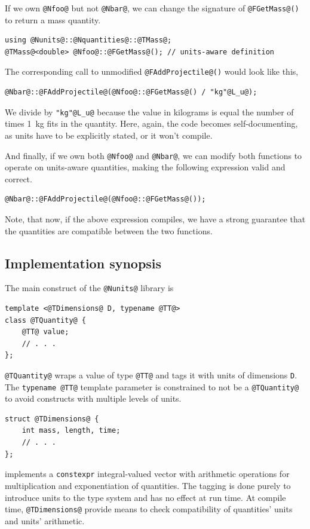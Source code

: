 \documentclass[11pt,letterpaper]{article}
\makeatletter
\newcommand{\lib}{\lstinline{@Nunits@} library}
\makeatother
\begin{document}
If we own \lstinline{@Nfoo@} but not \lstinline{@Nbar@}, we can change the signature of
\lstinline{@FGetMass@()} to return a mass quantity.
%
\begin{lstlisting}
using @Nunits@::@Nquantities@::@TMass@;
@TMass@<double> @Nfoo@::@FGetMass@(); // units-aware definition
\end{lstlisting}
%
The corresponding call to unmodified \lstinline{@FAddProjectile@()} would look like this,
%
\begin{lstlisting}[label={lst:example_division}]
@Nbar@::@FAddProjectile@(@Nfoo@::@FGetMass@() / "kg"@L_u@);
\end{lstlisting}
%
We divide by \lstinline{"kg"@L_u@} because the value in kilograms
is equal the number of times 1~kg fits in the quantity.
Here, again, the code becomes self-documenting, as units have to be explicitly stated, or it won't
compile.

And finally, if we own both \lstinline{@Nfoo@} and \lstinline{@Nbar@}, we can modify both functions
to operate on units-aware quantities, making the following expression valid and correct.
%
\begin{lstlisting}
@Nbar@::@FAddProjectile@(@Nfoo@::@FGetMass@());
\end{lstlisting}
Note, that now, if the above expression compiles, we have a strong guarantee that the quantities
are compatible between the two functions.

\subsection{Implementation synopsis} %

The main construct of the \lib{} is
%
\begin{lstlisting}
template <@TDimensions@ D, typename @TT@>
class @TQuantity@ {
    @TT@ value;
    // . . .
};
\end{lstlisting}
%
\lstinline{@TQuantity@} wraps a value of type \lstinline{@TT@} and tags it with units of dimensions
\lstinline{D}.
The \lstinline{typename @TT@} template parameter is constrained to not be a \lstinline{@TQuantity@}
to avoid constructs with multiple levels of units.
%
\begin{lstlisting}
struct @TDimensions@ {
    int mass, length, time;
    // . . .
};
\end{lstlisting}
%
implements a \lstinline{constexpr} integral-valued vector with arithmetic operations
for multiplication and exponentiation of quantities.
The tagging is done purely to introduce units to the type system and has no effect at run time.
At compile time, \lstinline{@TDimensions@} provide means to check compatibility of quantities'
units and units' arithmetic.
\end{document}
